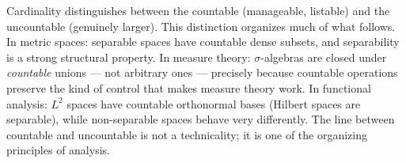 \begin{remark*}[Transition]
Cardinality distinguishes between the countable (manageable, listable) and the
uncountable (genuinely larger). This distinction organizes much of what
follows. In metric spaces: separable spaces have countable dense subsets, and
separability is a strong structural property. In measure theory: $\sigma$-algebras
are closed under \emph{countable} unions — not arbitrary ones — precisely because
countable operations preserve the kind of control that makes measure theory work.
In functional analysis: $L^2$ spaces have countable orthonormal bases
(Hilbert spaces are separable), while non-separable spaces behave very
differently. The line between countable and uncountable is not a technicality;
it is one of the organizing principles of analysis.
\end{remark*}
